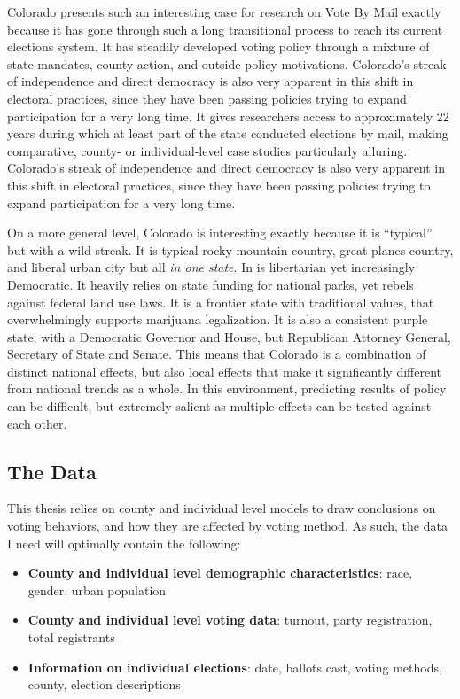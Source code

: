\documentclass[]{article}
\begin{document}
Colorado presents such an interesting case for research on Vote By Mail
exactly because it has gone through such a long transitional process to
reach its current elections system. It has steadily developed voting
policy through a mixture of state mandates, county action, and outside
policy motivations. Colorado's streak of independence and direct
democracy is also very apparent in this shift in electoral practices,
since they have been passing policies trying to expand participation for
a very long time. It gives researchers access to approximately 22 years
during which at least part of the state conducted elections by mail,
making comparative, county- or individual-level case studies
particularly alluring. Colorado's streak of independence and direct
democracy is also very apparent in this shift in electoral practices,
since they have been passing policies trying to expand participation for
a very long time.

On a more general level, Colorado is interesting exactly because it is
``typical'' but with a wild streak. It is typical rocky mountain
country, great planes country, and liberal urban city but all \emph{in
one state}. In is libertarian yet increasingly Democratic. It heavily
relies on state funding for national parks, yet rebels against federal
land use laws. It is a frontier state with traditional values, that
overwhelmingly supports marijuana legalization. It is also a consistent
purple state, with a Democratic Governor and House, but Republican
Attorney General, Secretary of State and Senate. This means that
Colorado is a combination of distinct national effects, but also local
effects that make it significantly different from national trends as a
whole. In this environment, predicting results of policy can be
difficult, but extremely salient as multiple effects can be tested
against each other.

\subsection{The Data}\label{the-data}

This thesis relies on county and individual level models to draw
conclusions on voting behaviors, and how they are affected by voting
method. As such, the data I need will optimally contain the following:

\begin{itemize}
\item
  \textbf{County and individual level demographic characteristics}:
  race, gender, urban population
\item
  \textbf{County and individual level voting data}: turnout, party
  registration, total registrants
\item
  \textbf{Information on individual elections}: date, ballots cast,
  voting methods, county, election descriptions
\end{itemize}
\end{document}
